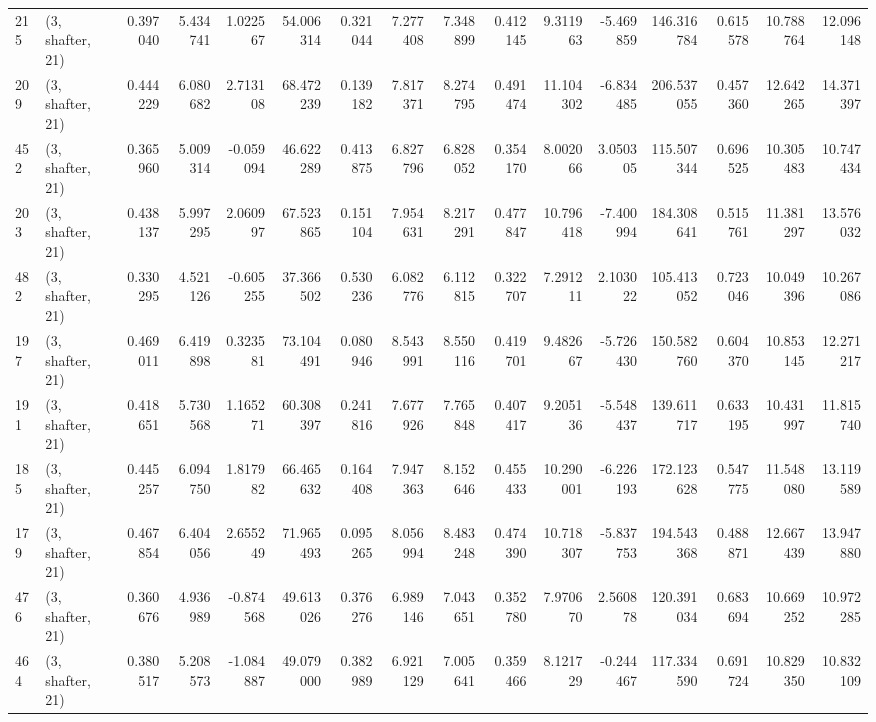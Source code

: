 \begin{tabular}{llrrrrrrrrrrrrrr}
215 &  (3, shafter, 21) &   0.397040 &   5.434741 &   1.022567 &    54.006314 &   0.321044 &   7.277408 &   7.348899 &  0.412145 &   9.311963 &  -5.469859 &   146.316784 &  0.615578 &  10.788764 &  12.096148 \\
209 &  (3, shafter, 21) &   0.444229 &   6.080682 &   2.713108 &    68.472239 &   0.139182 &   7.817371 &   8.274795 &  0.491474 &  11.104302 &  -6.834485 &   206.537055 &  0.457360 &  12.642265 &  14.371397 \\
452 &  (3, shafter, 21) &   0.365960 &   5.009314 &  -0.059094 &    46.622289 &   0.413875 &   6.827796 &   6.828052 &  0.354170 &   8.002066 &   3.050305 &   115.507344 &  0.696525 &  10.305483 &  10.747434 \\
203 &  (3, shafter, 21) &   0.438137 &   5.997295 &   2.060997 &    67.523865 &   0.151104 &   7.954631 &   8.217291 &  0.477847 &  10.796418 &  -7.400994 &   184.308641 &  0.515761 &  11.381297 &  13.576032 \\
482 &  (3, shafter, 21) &   0.330295 &   4.521126 &  -0.605255 &    37.366502 &   0.530236 &   6.082776 &   6.112815 &  0.322707 &   7.291211 &   2.103022 &   105.413052 &  0.723046 &  10.049396 &  10.267086 \\
197 &  (3, shafter, 21) &   0.469011 &   6.419898 &   0.323581 &    73.104491 &   0.080946 &   8.543991 &   8.550116 &  0.419701 &   9.482667 &  -5.726430 &   150.582760 &  0.604370 &  10.853145 &  12.271217 \\
191 &  (3, shafter, 21) &   0.418651 &   5.730568 &   1.165271 &    60.308397 &   0.241816 &   7.677926 &   7.765848 &  0.407417 &   9.205136 &  -5.548437 &   139.611717 &  0.633195 &  10.431997 &  11.815740 \\
185 &  (3, shafter, 21) &   0.445257 &   6.094750 &   1.817982 &    66.465632 &   0.164408 &   7.947363 &   8.152646 &  0.455433 &  10.290001 &  -6.226193 &   172.123628 &  0.547775 &  11.548080 &  13.119589 \\
179 &  (3, shafter, 21) &   0.467854 &   6.404056 &   2.655249 &    71.965493 &   0.095265 &   8.056994 &   8.483248 &  0.474390 &  10.718307 &  -5.837753 &   194.543368 &  0.488871 &  12.667439 &  13.947880 \\
476 &  (3, shafter, 21) &   0.360676 &   4.936989 &  -0.874568 &    49.613026 &   0.376276 &   6.989146 &   7.043651 &  0.352780 &   7.970670 &   2.560878 &   120.391034 &  0.683694 &  10.669252 &  10.972285 \\
464 &  (3, shafter, 21) &   0.380517 &   5.208573 &  -1.084887 &    49.079000 &   0.382989 &   6.921129 &   7.005641 &  0.359466 &   8.121729 &  -0.244467 &   117.334590 &  0.691724 &  10.829350 &  10.832109 \\

\end{tabular}
